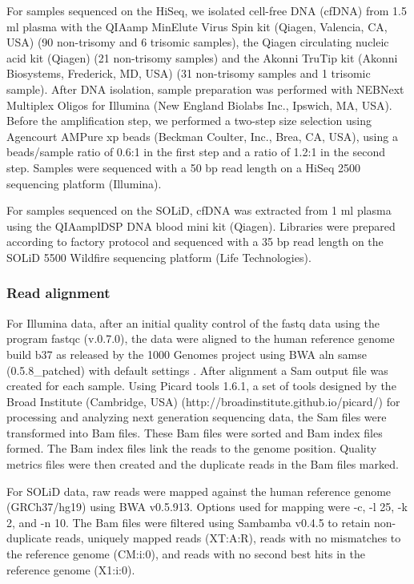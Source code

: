 For samples sequenced on the HiSeq, we isolated cell-free DNA (cfDNA) from 1.5 ml plasma with the QIAamp MinElute Virus Spin kit (Qiagen, Valencia, CA, USA) (90 non-trisomy and 6 trisomic samples), the Qiagen circulating nucleic acid kit (Qiagen) (21 non-trisomy samples) and the Akonni TruTip kit (Akonni Biosystems, Frederick, MD, USA) (31 non-trisomy samples and 1 trisomic sample). 
After DNA isolation, sample preparation was performed with NEBNext Multiplex Oligos for Illumina (New England Biolabs Inc., Ipswich, MA, USA). 
Before the amplification step, we performed a two-step size selection using Agencourt AMPure xp beads (Beckman Coulter, Inc., Brea, CA, USA), using a beads/sample ratio of 0.6:1 in the first step and a ratio of 1.2:1 in the second step. Samples were sequenced with a 50 bp read length on a HiSeq 2500 sequencing platform (Illumina).

For samples sequenced on the SOLiD, cfDNA was extracted from 1 ml plasma using the QIAamplDSP DNA blood mini kit (Qiagen). 
Libraries were prepared according to factory protocol and sequenced with a 35 bp read length on the SOLiD 5500 Wildfire sequencing platform (Life Technologies).

\subsubsection{Read alignment}
For Illumina data, after an initial quality control of the fastq data using the program fastqc (v.0.7.0), the data were aligned to the human reference genome build b37 as released by the 1000 Genomes project \cite{Durbin_2010} using BWA aln samse (0.5.8\_patched) with default settings \cite{Li_2010}. 
After alignment a Sam output file \cite{Li_2009} was created for each sample. 
Using Picard tools 1.6.1, a set of tools designed by the Broad Institute (Cambridge, USA) (http://broadinstitute.github.io/picard/) for processing and analyzing next generation sequencing data, the Sam files were transformed into Bam files. 
These Bam files were sorted and Bam index files formed. 
The Bam index files link the reads to the genome position. 
Quality metrics files were then created and the duplicate reads in the Bam files marked.

For SOLiD data, raw reads were mapped against the human reference genome (GRCh37/hg19) using BWA v0.5.913. 
Options used for mapping were -c, -l 25, -k 2, and -n 10. 
The Bam files were filtered using Sambamba v0.4.5 \cite{Tarasov_2015} to retain non-duplicate reads, uniquely mapped reads (XT:A:R), reads with no mismatches to the reference genome (CM:i:0), and reads with no second best hits in the reference genome (X1:i:0).

